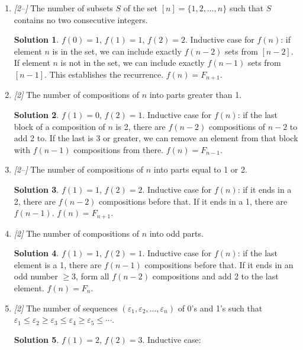 \documentclass[11pt]{article}
\theoremstyle{definition}
\newtheorem*{solution}{Solution}
\begin{document}
\begin{enumerate}[label=(\alph*)]
  \item \textit{[2--]} The number of subsets $S$ of the set $[n] = \{1,2,\ldots,n\}$
    such that $S$ contains no two consecutive integers.
    \begin{solution}
    $f(0) = 1$, $f(1) = 1$, $f(2) = 2$. Inductive case for $f(n)$: if element $n$
    is in the set, we can include exactly $f(n-2)$ sets from $[n-2]$. If element $n$
    is not in the set, we can include exactly $f(n-1)$ sets from $[n-1]$. This
    establishes the recurrence. $f(n) = F_{n+1}$.
    \end{solution}

  \item \textit{[2]} The number of compositions of $n$ into parts greater than 1.
    \begin{solution}
    $f(1) = 0$, $f(2) = 1$. Inductive case for $f(n)$: if the last block of a
    composition of $n$ is 2, there are $f(n-2)$ compositions of $n-2$ to add 2 to.
    If the last is 3 or greater, we can remove an element from that block with
    $f(n-1)$ compositions from there. $f(n) = F_{n-1}$.
    \end{solution}

  \item \textit{[2--]} The number of compositions of $n$ into parts equal to 1 or 2.
    \begin{solution}
    $f(1) = 1$, $f(2) = 2$. Inductive case for $f(n)$: if it ends in a 2, there are
    $f(n-2)$ compositions before that. If it ends in a 1, there are $f(n-1)$.
    $f(n) = F_{n+1}$.
    \end{solution}

  \item \textit{[2]} The number of compositions of $n$ into odd parts.
    \begin{solution}
    $f(1) = 1$, $f(2) = 1$. Inductive case for $f(n)$: if the last element is a 1,
    there are $f(n-1)$ compositions before that. If it ends in an odd number
    $\geq 3$, form all $f(n-2)$ compositions and add 2 to the last element.
    $f(n) = F_n$.
    \end{solution}

  \item \textit{[2]} The number of sequences $(\varepsilon_1, \varepsilon_2, \ldots,
    \varepsilon_n)$ of 0's and 1's such that $\varepsilon_1 \leq \varepsilon_2 \geq
    \varepsilon_3 \leq \varepsilon_4 \geq \varepsilon_5 \leq \cdots$.
    \begin{solution}
    $f(1) = 2$, $f(2) = 3$. Inductive case:


\end{solution}
\end{enumerate}
\end{document}
